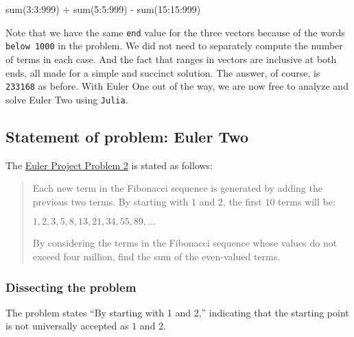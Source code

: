 \documentclass[
  a4paper,
]{article}
\newenvironment{Shaded}{\begin{snugshade}}{\end{snugshade}}
\newcommand{\FloatTok}[1]{\textcolor[rgb]{0.75,0.75,0.82}{#1}}
\newcommand{\FunctionTok}[1]{\textcolor[rgb]{0.94,0.94,0.56}{#1}}
\newcommand{\NormalTok}[1]{\textcolor[rgb]{0.80,0.80,0.80}{#1}}
\newcommand{\OperatorTok}[1]{\textcolor[rgb]{0.94,0.94,0.82}{#1}}
\begin{document}
\begin{Shaded}
\begin{Highlighting}[]
\FunctionTok{sum}\NormalTok{(}\FloatTok{3}\OperatorTok{:}\FloatTok{3}\OperatorTok{:}\FloatTok{999}\NormalTok{) }\OperatorTok{+} \FunctionTok{sum}\NormalTok{(}\FloatTok{5}\OperatorTok{:}\FloatTok{5}\OperatorTok{:}\FloatTok{999}\NormalTok{) }\OperatorTok{{-}} \FunctionTok{sum}\NormalTok{(}\FloatTok{15}\OperatorTok{:}\FloatTok{15}\OperatorTok{:}\FloatTok{999}\NormalTok{)}
\end{Highlighting}
\end{Shaded}

Note that we have the same \texttt{end} value for the three vectors
because of the words \texttt{below\ 1000} in the problem. We did not
need to separately compute the number of terms in each case. And the
fact that ranges in vectors are inclusive at both ends, all made for a
simple and succinct solution. The answer, of course, is \texttt{233168}
as before. With Euler One out of the way, we are now free to analyze and
solve Euler Two using \texttt{Julia}.

\hypertarget{statement-of-problem-euler-two}{%
\subsection{Statement of problem: Euler
Two}\label{statement-of-problem-euler-two}}

The \href{https://projecteuler.net/problem=2}{Euler Project Problem 2}
is stated as follows:

\begin{quote}
Each new term in the Fibonacci sequence is generated by adding the
previous two terms. By starting with \(1\) and \(2\), the first \(10\)
terms will be:

\(1, 2, 3, 5, 8, 13, 21, 34, 55, 89, \ldots\)

By considering the terms in the Fibonacci sequence whose values do not
exceed four million, find the sum of the even-valued terms.
\end{quote}

\hypertarget{dissecting-the-problem}{%
\subsubsection{Dissecting the problem}\label{dissecting-the-problem}}

The problem states ``By starting with 1 and 2,'' indicating that the
starting point is not universally accepted as \(1\) and \(2\).
\end{document}

